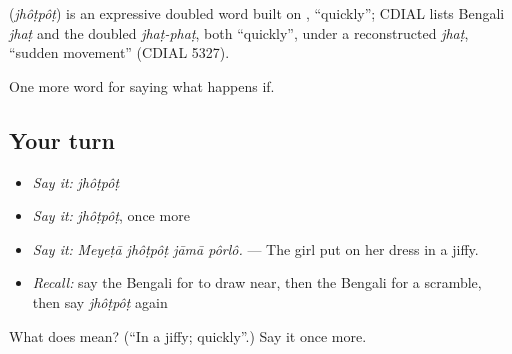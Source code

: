 \begin{cousinweb}
\textbf{} (\emph{jhôṭpôṭ}) is an expressive doubled word built on , \textquotedblleft{}quickly\textquotedblright{}; CDIAL lists Bengali \emph{jhaṭ} and the doubled \emph{jhaṭ-phaṭ}, both \textquotedblleft{}quickly\textquotedblright{}, under a reconstructed \emph{jhaṭ}, \textquotedblleft{}sudden movement\textquotedblright{} (CDIAL 5327).
\end{cousinweb}

\begin{grammarlens}[title={What you've built}]
One more word for saying what happens if.
\end{grammarlens}

\subsection*{Your turn}
\begin{itemize}
\raggedright
  \item \emph{Say it:} \emph{jhôṭpôṭ}
  \item \emph{Say it:} \emph{jhôṭpôṭ}, once more
  \item \emph{Say it:} \emph{Meyeṭā jhôṭpôṭ jāmā pôrlô.} — The girl put on her dress in a jiffy.
  \item \emph{Recall:} say the Bengali for to draw near, then the Bengali for a scramble, then say \emph{jhôṭpôṭ} again
\end{itemize}

\begin{tcolorbox}[breakable,colback=teal!4,colframe=teal!35!black,title={Before you move on}]
What does  mean? (\textquotedblleft{}In a jiffy; quickly\textquotedblright{}.) Say it once more.
\end{tcolorbox}
